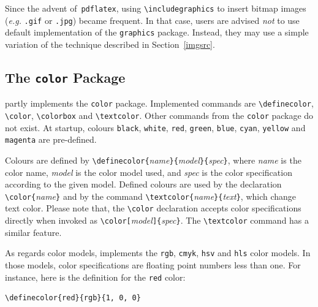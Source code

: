 \fi
Since the advent of~\texttt{pdflatex},
using \verb+\includegraphics+ to insert bitmap images
(\emph{e.g.} \texttt{.gif} or \texttt{.jpg})
became frequent.
In that case, users are advised \emph{not} to use \hevea{} default
implementation of the \texttt{graphics} package.
Instead, they may use a simple variation of
the technique described in Section~\ref{imgsrc}.


\subsection{The \texttt{color} Package}%
\label{color}\label{color:package}%
\newcommand{\showcolor}[1]{\texttt{#1}}
\hevea{} partly implements the \texttt{color} package.
Implemented commands are \verb+\definecolor+, \verb+\color+,
\verb+\colorbox+ and
\verb+\textcolor+. Other commands from the \texttt{color} package do
not exist.
At startup,
colours \showcolor{black}, \showcolor{white},
\showcolor{red}, \showcolor{green}, \showcolor{blue},
\showcolor{cyan}, \showcolor{yellow} and \showcolor{magenta} are
pre-defined.

Colours are defined by
\verb+\definecolor{+\textit{name}\verb+}{+\textit{model}\verb+}{+\textit{spec}\verb+}+,
where \textit{name} is the color name, \textit{model} is the color
model used, and \textit{spec} is the color specification according to
the given model.
Defined colours are used by the declaration
\verb+\color{+\textit{name}\verb+}+ and by the command
\verb+\textcolor{+\textit{name}\verb+}{+\textit{text}\verb+}+, which
change text color.
Please note that, the \verb+\color+ declaration
accepts color specifications directly
when invoked as
\verb+\color[+\textit{model}\verb+]{+\textit{spec}\verb+}+.
The \verb+\textcolor+ command has a similar feature.

As regards color models, \hevea{} implements the \texttt{rgb},
\texttt{cmyk}, \texttt{hsv} and \texttt{hls} color models.
In those models, color specifications are floating point numbers less
than one.
For instance, here is the definition for the \texttt{red} color:
\begin{verbatim}
\definecolor{red}{rgb}{1, 0, 0}
\end{verbatim}


